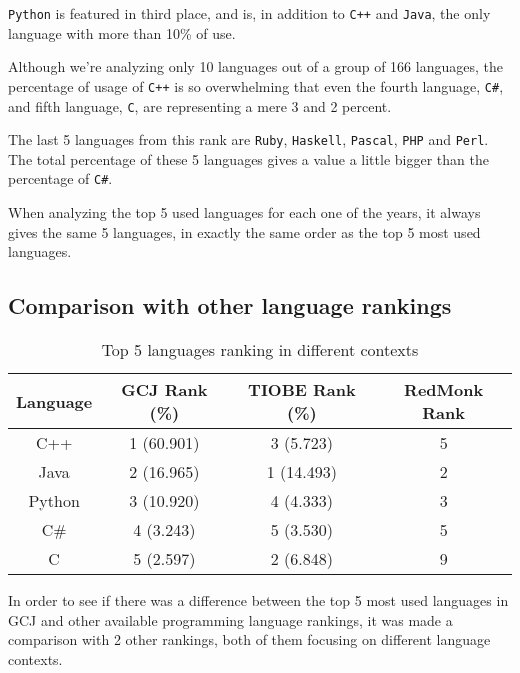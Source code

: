 \documentclass{article}
\begin{document}
\begin{multicols*}{2}
\texttt{Python} is featured in third place, and is, in addition to \texttt{C++} and \texttt{Java}, the only language with more than 10\% of use.

Although we're analyzing only 10 languages out of a group of 166 languages, the percentage of usage of \texttt{C++} is so overwhelming that even the fourth language, \texttt{C\#}, and fifth language, \texttt{C}, are representing a mere 3 and 2 percent.

The last 5 languages from this rank are \texttt{Ruby}, \texttt{Haskell}, \texttt{Pascal}, \texttt{PHP} and \texttt{Perl}. The total percentage of these 5 languages gives a value a little bigger than the percentage of \texttt{C\#}.


When analyzing the top 5 used languages for each one of the years, it always gives the same 5 languages, in exactly the same order as the top 5 most used languages.


\subsection{Comparison with other language rankings}

\begin{table*}[!ht]
\centering
\caption{Top 5 languages ranking in different contexts}
\label{diff_contexts}
\begin{tabular}{c|c|c|c}
\textbf{Language} & \textbf{GCJ Rank (\%)} & \textbf{TIOBE Rank (\%)} & \textbf{RedMonk Rank} \\ \hline
C++               & 1 (60.901)             & 3 (5.723)                & 5                     \\
Java              & 2 (16.965)             & 1 (14.493)               & 2                     \\
Python            & 3 (10.920)             & 4 (4.333)                & 3                     \\
C\#               & 4 (3.243)              & 5 (3.530)                & 5                     \\
C                 & 5 (2.597)              & 2 (6.848)                & 9
\end{tabular}
\end{table*}

In order to see if there was a difference between the top 5 most used languages in GCJ and other available programming language rankings, it was made a comparison with 2 other rankings, both of them focusing on different language contexts.


\end{multicols*}
\end{document}

